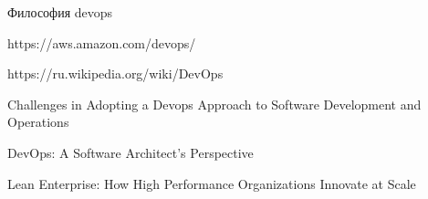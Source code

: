 

\begin{enumerate}[{label=[\arabic{*}]}]

\item Философия devops
    \label{book:Effective Devops}

\item https://aws.amazon.com/devops/
    \label{site:aws.amazon.com/devops}

\item https://ru.wikipedia.org/wiki/DevOps
    \label{site:ru.wikipedia.org/wiki/devops}

\item Challenges in Adopting a Devops Approach to Software Development and Operations
    \label{article:Challenges in Adopting a Devops}

\item DevOps: A Software Architect's Perspective
    \label{book:DevOps: A Software Architect's Perspective}

\item Lean Enterprise: How High Performance Organizations Innovate at Scale
    \label{book:Lean Enterprise}

\end{enumerate}
